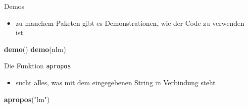 \documentclass[ignorenonframetext,]{beamer}
\newenvironment{Shaded}{}{}
\newcommand{\KeywordTok}[1]{\textcolor[rgb]{0.00,0.44,0.13}{\textbf{{#1}}}}
\newcommand{\StringTok}[1]{\textcolor[rgb]{0.25,0.44,0.63}{{#1}}}
\newcommand{\NormalTok}[1]{{#1}}
\providecommand{\tightlist}{%
\setlength{\itemsep}{0pt}\setlength{\parskip}{0pt}}
\begin{document}
\begin{frame}[fragile]{Demos}

\begin{itemize}
\tightlist
\item
  zu manchem Paketen gibt es Demonstrationen, wie der Code zu verwenden
  ist
\end{itemize}

\begin{Shaded}
\begin{Highlighting}[]
\KeywordTok{demo}\NormalTok{()}
\KeywordTok{demo}\NormalTok{(nlm)}
\end{Highlighting}
\end{Shaded}

\end{frame}

\begin{frame}[fragile]{Die Funktion \texttt{apropos}}

\begin{itemize}
\tightlist
\item
  sucht alles, was mit dem eingegebenen String in Verbindung steht
\end{itemize}

\begin{Shaded}
\begin{Highlighting}[]
\KeywordTok{apropos}\NormalTok{(}\StringTok{"lm"}\NormalTok{)}
\end{Highlighting}
\end{Shaded}


\end{frame}
\end{document}
